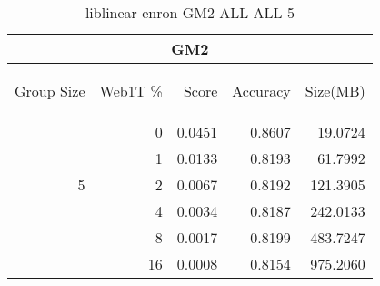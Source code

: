 \begin{center}
\begin{table}[htbp]
\begin{tabular}{ | r | r | r | r | r |}
\hline
\multicolumn{5}{|c|}{GM2}\\
\hline
\begin{sideways}Group Size\end{sideways} & \begin{sideways}Web1T \%\end{sideways} & \begin{sideways}Score\end{sideways} & \begin{sideways}Accuracy\end{sideways} & \begin{sideways}Size(MB)\end{sideways}\\
\hline
\multirow{5}{*}{5}
 & 0 & 0.0451 & 0.8607 & 19.0724\\ \cline{2-5}
 & 1 & 0.0133 & 0.8193 & 61.7992\\ \cline{2-5}
 & 2 & 0.0067 & 0.8192 & 121.3905\\ \cline{2-5}
 & 4 & 0.0034 & 0.8187 & 242.0133\\ \cline{2-5}
 & 8 & 0.0017 & 0.8199 & 483.7247\\ \cline{2-5}
 & 16 & 0.0008 & 0.8154 & 975.2060\\ \cline{2-5}
\hline
\end{tabular}
\caption{liblinear-enron-GM2-ALL-ALL-5}
\label{table:liblinear-enron-GM2-ALL-ALL-5}
\end{table}
\end{center}

